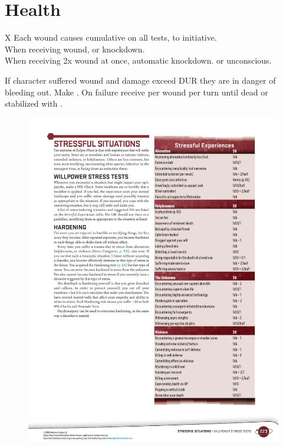 
\section*{Health}


\begin{eptable}{ X }
   Each wound causes cumulative  on all tests,  to initiative.\\
   When receiving wound,  or knockdown.\\
   When receiving 2x wound at once, automatic knockdown.  or unconscious.\\
\end{eptable}

\begin{itemize}
    \itembox If character suffered wound and damage exceed DUR they are in
            danger of bleeding out. Make . On failure receive
             per wound per turn until dead or stabilized with .
\end{itemize}

\bigskip

\begin{figure}[htbp!]%
   \includegraphics[scale=0.82]{gfx/health-stress}%
\end{figure}%

